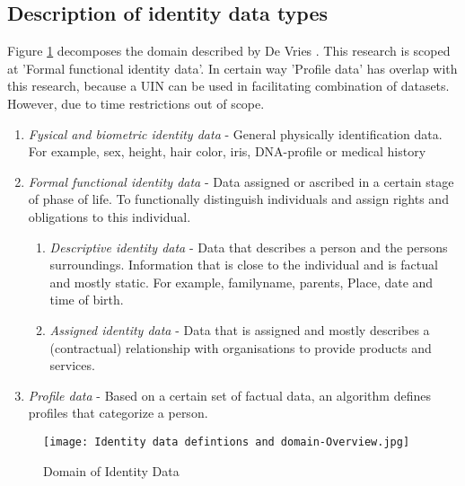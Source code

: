 \subsection*{Description of identity data types}
Figure \ref{fig:ID_domain} decomposes the domain described by De Vries \etal. This research is scoped at 'Formal functional identity data'. In certain way 'Profile data' has overlap with this research, because a UIN can be used in facilitating combination of datasets. However, due to time restrictions out of scope.
\begin{enumerate}
\item \textit{Fysical and biometric identity data} - General physically identification data. For example, sex, height, hair color, iris, DNA-profile or medical history
\item \textit{Formal functional identity data} - Data assigned or ascribed in a certain stage of phase of life. To functionally distinguish individuals and assign rights and obligations to this individual.
\begin{enumerate}
\item \textit{Descriptive identity data} - Data that describes a person and the persons surroundings. Information that is close to the individual and is factual and mostly static. For example, familyname, parents, Place, date and time of birth. 
\item \textit{Assigned identity data} - Data that is assigned and mostly describes a (contractual) relationship with organisations to provide products and services.
\end{enumerate}
\item \textit{Profile data} - Based on a certain set of factual data, an algorithm defines profiles that categorize a person. 
\end{enumerate}
\graphicspath{ {./images/} }
\begin{figure}[t]
\texttt{[image: Identity data defintions and domain-Overview.jpg]}\\
\caption{Domain of Identity Data}
\label{fig:ID_domain}
\end{figure}

